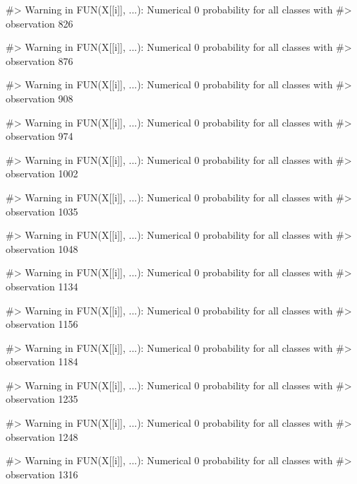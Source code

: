 \begin{Schunk}
\begin{Soutput}
#> Warning in FUN(X[[i]], ...): Numerical 0 probability for all classes with
#> observation 826
\end{Soutput}
\begin{Soutput}
#> Warning in FUN(X[[i]], ...): Numerical 0 probability for all classes with
#> observation 876
\end{Soutput}
\begin{Soutput}
#> Warning in FUN(X[[i]], ...): Numerical 0 probability for all classes with
#> observation 908
\end{Soutput}
\begin{Soutput}
#> Warning in FUN(X[[i]], ...): Numerical 0 probability for all classes with
#> observation 974
\end{Soutput}
\begin{Soutput}
#> Warning in FUN(X[[i]], ...): Numerical 0 probability for all classes with
#> observation 1002
\end{Soutput}
\begin{Soutput}
#> Warning in FUN(X[[i]], ...): Numerical 0 probability for all classes with
#> observation 1035
\end{Soutput}
\begin{Soutput}
#> Warning in FUN(X[[i]], ...): Numerical 0 probability for all classes with
#> observation 1048
\end{Soutput}
\begin{Soutput}
#> Warning in FUN(X[[i]], ...): Numerical 0 probability for all classes with
#> observation 1134
\end{Soutput}
\begin{Soutput}
#> Warning in FUN(X[[i]], ...): Numerical 0 probability for all classes with
#> observation 1156
\end{Soutput}
\begin{Soutput}
#> Warning in FUN(X[[i]], ...): Numerical 0 probability for all classes with
#> observation 1184
\end{Soutput}
\begin{Soutput}
#> Warning in FUN(X[[i]], ...): Numerical 0 probability for all classes with
#> observation 1235
\end{Soutput}
\begin{Soutput}
#> Warning in FUN(X[[i]], ...): Numerical 0 probability for all classes with
#> observation 1248
\end{Soutput}
\begin{Soutput}
#> Warning in FUN(X[[i]], ...): Numerical 0 probability for all classes with
#> observation 1316
\end{Soutput}

\end{Schunk}
